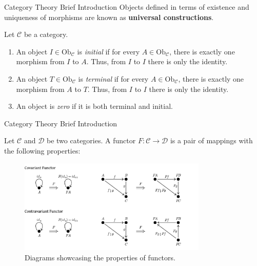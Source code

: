 \documentclass[aspectratio=169,xcolor=dvipsnames,9pt]{beamer}
\begin{document}
\begin{frame}[fragile]{Category Theory Brief Introduction}
	Objects defined in terms of existence and
	uniqueness of morphisms are known as \textbf{universal constructions}.
	\begin{definition}
		Let $\mathcal C$ be a category.
		\begin{enumerate}[1.]
			\item An object $I \in \text{Ob}_\mathcal C$ is \textit{initial} if for every $A \in \text{Ob}_\mathcal C$,
			      there is exactly one morphism from $I$ to $A$. Thus, from $I$ to $I$ there is only the identity.
			\item An object $T \in \text{Ob}_\mathcal C$ is \textit{terminal} if for every $A \in \text{Ob}_\mathcal C$,
			      there is exactly one morphism from $A$ to $T$. Thus, from $I$ to $I$ there is only the identity.
			\item An object is \textit{zero} if it is both terminal and initial.
		\end{enumerate}
	\end{definition}
\end{frame}

\begin{frame}[fragile]{Category Theory Brief Introduction}
	\begin{definition}[Functor]
		Let $\mathcal C$ and $\mathcal D$ be two categories. A functor $F: \mathcal C \to \mathcal D$ is
		a pair of mappings with the following properties:
		\begin{figure}[H]
			\begin{center}
				\includegraphics[width=0.8\textwidth]{./figures/Functor.pdf}
			\end{center}
			\caption{Diagrams showcasing the properties of functors.}
			\label{fig:Functor}
		\end{figure}
	\end{definition}

\end{frame}
\end{document}

